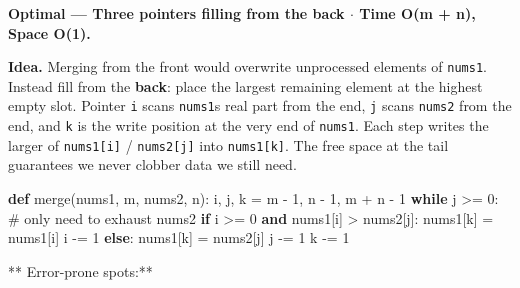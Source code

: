 \documentclass[11pt]{article}
\newenvironment{Shaded}{\begin{snugshade}}{\end{snugshade}}
\newcommand{\CommentTok}[1]{\textcolor[rgb]{0.48,0.49,0.49}{#1}}
\newcommand{\ControlFlowTok}[1]{\textcolor[rgb]{0.99,0.74,0.29}{\textbf{#1}}}
\newcommand{\DecValTok}[1]{\textcolor[rgb]{0.96,0.45,0.00}{#1}}
\newcommand{\KeywordTok}[1]{\textcolor[rgb]{0.81,0.81,0.76}{\textbf{#1}}}
\newcommand{\NormalTok}[1]{\textcolor[rgb]{0.81,0.81,0.76}{#1}}
\newcommand{\OperatorTok}[1]{\textcolor[rgb]{0.81,0.81,0.76}{#1}}
\begin{document}
\textbf{Optimal --- Three pointers filling from the back \(\cdot\) Time O(m + n), Space O(1).}

\textbf{Idea.} Merging from the front would overwrite unprocessed elements of \texttt{nums1}. Instead fill from the \textbf{back}: place the largest remaining element at the highest empty slot. Pointer \texttt{i} scans \texttt{nums1}\textquotesingle s real part from the end, \texttt{j} scans \texttt{nums2} from the end, and \texttt{k} is the write position at the very end of \texttt{nums1}. Each step writes the larger of \texttt{nums1{[}i{]}} / \texttt{nums2{[}j{]}} into \texttt{nums1{[}k{]}}. The free space at the tail guarantees we never clobber data we still need.


\begin{Shaded}
\begin{Highlighting}[]
\KeywordTok{def}\NormalTok{ merge(nums1, m, nums2, n):}
\NormalTok{    i, j, k }\OperatorTok{=}\NormalTok{ m }\OperatorTok{{-}} \DecValTok{1}\NormalTok{, n }\OperatorTok{{-}} \DecValTok{1}\NormalTok{, m }\OperatorTok{+}\NormalTok{ n }\OperatorTok{{-}} \DecValTok{1}
    \ControlFlowTok{while}\NormalTok{ j }\OperatorTok{\textgreater{}=} \DecValTok{0}\NormalTok{:                         }\CommentTok{\# only need to exhaust nums2}
        \ControlFlowTok{if}\NormalTok{ i }\OperatorTok{\textgreater{}=} \DecValTok{0} \KeywordTok{and}\NormalTok{ nums1[i] }\OperatorTok{\textgreater{}}\NormalTok{ nums2[j]:}
\NormalTok{            nums1[k] }\OperatorTok{=}\NormalTok{ nums1[i]}
\NormalTok{            i }\OperatorTok{{-}=} \DecValTok{1}
        \ControlFlowTok{else}\NormalTok{:}
\NormalTok{            nums1[k] }\OperatorTok{=}\NormalTok{ nums2[j]}
\NormalTok{            j }\OperatorTok{{-}=} \DecValTok{1}
\NormalTok{        k }\OperatorTok{{-}=} \DecValTok{1}
\end{Highlighting}
\end{Shaded}

** Error-prone spots:**
\end{document}
